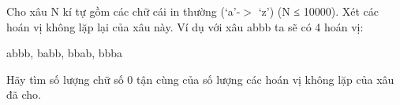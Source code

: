 Cho xâu N kí tự gồm các chữ cái in thường (‘a’-$>$ ‘z’) (N   ≤ 10000). Xét các hoán vị không lặp lại của xâu này. Ví   dụ với xâu abbb ta sẽ có 4 hoán vị:  

   abbb, babb, bbab, bbba  

   Hãy tìm số lượng chữ số 0 tận cùng của số lượng các   hoán vị không lặp của xâu đã cho.  

\